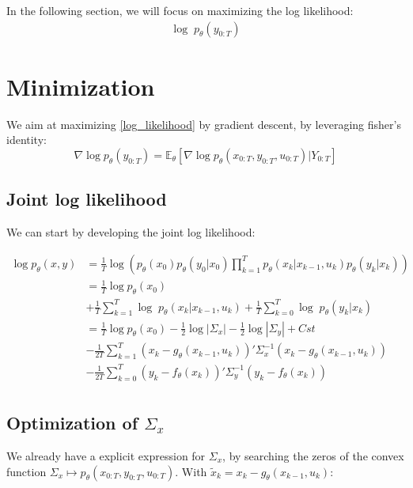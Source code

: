 \documentclass[10pt,a4paper]{report}
\begin{document}
In the following section, we will focus on maximizing the log likelihood:
\begin{align}
	\log \; p_{\theta}(y_{0:T})
	\label{log_likelihood}
\end{align}

\section{Minimization}
We aim at maximizing \ref{log_likelihood} by gradient descent, by leveraging fisher's identity:
$$
	\nabla \log p_\theta(y_{0:T}) = \mathbb{E}_\theta \left[ \nabla\log p_\theta(x_{0:T}, y_{0:T}, u_{0:T}) | Y_{0:T} \right]
$$
\subsection{Joint log likelihood}
We can start by developing the joint log likelihood:

\begin{align*}
	\log p_{\theta}(x, y) & = \frac{1}{T} \log\left(p_\theta(x_0)p_\theta(y_0 | x_0)\prod_{k=1}^{T} p_{\theta}(x_k | x_{k-1}, u_k) p_{\theta}(y_k | x_k)\right) \\
						   & = \frac{1}{T} \log p_\theta(x_0)                                                                                                    \\
						   & + \frac{1}{T} \sum_{k=1}^{T} \log \; p_{\theta}(x_k | x_{k-1}, u_k) + \frac{1}{T} \sum_{k=0}^{T} \log \; p_{\theta}(y_k | x_k)      \\
						   & = \frac{1}{T} \log p_\theta(x_0) -\frac{1}{2} \log|\Sigma_x| -\frac{1}{2} \log|\Sigma_y| + Cst                                      \\
                                                   & - \frac{1}{2T} \sum_{k=1}^{T}(x_k - g_\theta(x_{k-1}, u_{k}))' \Sigma_x^{-1} (x_k - g_\theta(x_{k-1}, u_{k})) \\
						   & - \frac{1}{2T} \sum_{k=0}^{T}(y_k - f_\theta(x_k))' \Sigma_y^{-1} (y_k - f_\theta(x_k))                                             \\
\end{align*}

\subsection{Optimization of $\Sigma_x$}
We already have a explicit expression for $\Sigma_x$, by searching the zeros of the convex function $\Sigma_x \mapsto p_\theta(x_{0:T}, y_{0:T}, u_{0:T})$.
With $\tilde x_k = x_k - g_\theta(x_{k-1}, u_k)$:
\end{document}
